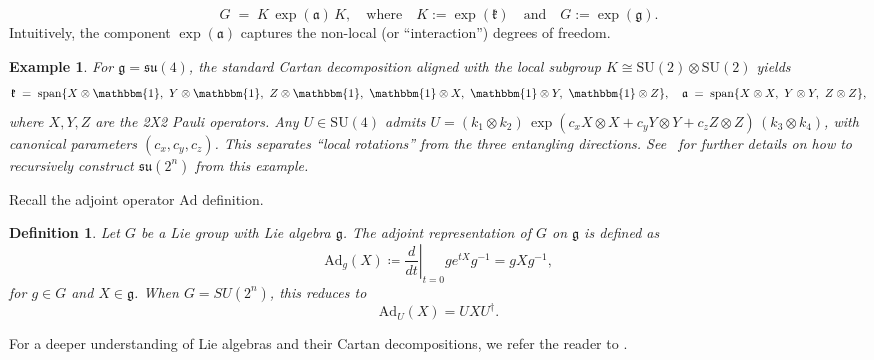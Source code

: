\documentclass{article}
\newtheorem{definition}{Definition}
\newtheorem{example}{Example}
\begin{document}
    \begin{equation}\label{eq:KAK}
        G\;=\;K\,\exp(\mathfrak{a})\,K, \quad\text{where}\quad K:=\exp(\mathfrak{k}) \quad\text{and}\quad G:=\exp(\mathfrak{g}).
    \end{equation}
    Intuitively, the component $\exp(\mathfrak{a})$ captures the non-local (or ``interaction'') degrees of freedom.
    \begin{example}
        For $\mathfrak{g}=\mathfrak{su}(4)$, the standard Cartan decomposition aligned with the local subgroup $K \cong \mathrm{SU}(2)\otimes \mathrm{SU}(2)$ yields
    \begin{equation}\label{eq:su4-cartan}
        \mathfrak{k}\;=\;\mathrm{span}\{X\otimes \mathbbm{1},\ Y\otimes \mathbbm{1},\ Z\otimes \mathbbm{1},\ \mathbbm{1}\otimes X,\ \mathbbm{1}\otimes Y,\ \mathbbm{1}\otimes Z\},\quad
        \mathfrak{a}\;=\;\mathrm{span}\{X\otimes X,\ Y\otimes Y,\   Z\otimes Z\},
    \end{equation}
    where $X,Y,Z$ are the 2X2 Pauli operators. 
    Any $U\in \mathrm{SU}(4)$ admits $U=(k_1\otimes k_2)\,\exp(c_x X\otimes X+c_y Y\otimes Y+c_z Z\otimes Z)\,(k_3\otimes k_4)$, with canonical parameters $(c_x,c_y,c_z)$. This separates “local rotations” from the three entangling directions. See~\cite{khaneja2001cartan} for further details on how to recursively construct $\mathfrak{su}(2^n)$ from this example. 
    \end{example}

    Recall the adjoint operator $\mathrm{Ad}$ definition. 
    \begin{definition}
        Let $G$ be a Lie group with Lie algebra $\mathfrak{g}$. The adjoint representation of $G$ on $\mathfrak{g}$ is defined as
        \begin{equation}
            \mathrm{Ad}_g(X)\coloneqq \left.\frac{d}{dt}\right|_{t=0} ge^{tX}g^{-1} = gXg^{-1},
        \end{equation}
        for $g\in G$ and $X\in\mathfrak{g}$. When $G=SU(2^n)$, this reduces to 
        \begin{equation}
            \mathrm{Ad}_U(X) = UXU^\dagger.
        \end{equation}
        \end{definition}
    For a deeper understanding of Lie algebras and their Cartan decompositions, we refer the reader to \cite{hall2013lie}. 
    
\end{document}
